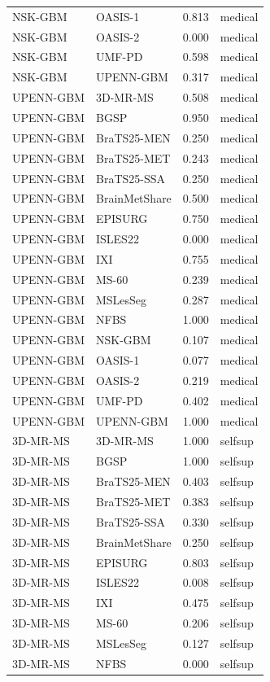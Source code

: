 \begin{tabular}{llrl}
NSK-GBM & OASIS-1 & 0.813 & medical \\
NSK-GBM & OASIS-2 & 0.000 & medical \\
NSK-GBM & UMF-PD & 0.598 & medical \\
NSK-GBM & UPENN-GBM & 0.317 & medical \\
UPENN-GBM & 3D-MR-MS & 0.508 & medical \\
UPENN-GBM & BGSP & 0.950 & medical \\
UPENN-GBM & BraTS25-MEN & 0.250 & medical \\
UPENN-GBM & BraTS25-MET & 0.243 & medical \\
UPENN-GBM & BraTS25-SSA & 0.250 & medical \\
UPENN-GBM & BrainMetShare & 0.500 & medical \\
UPENN-GBM & EPISURG & 0.750 & medical \\
UPENN-GBM & ISLES22 & 0.000 & medical \\
UPENN-GBM & IXI & 0.755 & medical \\
UPENN-GBM & MS-60 & 0.239 & medical \\
UPENN-GBM & MSLesSeg & 0.287 & medical \\
UPENN-GBM & NFBS & 1.000 & medical \\
UPENN-GBM & NSK-GBM & 0.107 & medical \\
UPENN-GBM & OASIS-1 & 0.077 & medical \\
UPENN-GBM & OASIS-2 & 0.219 & medical \\
UPENN-GBM & UMF-PD & 0.402 & medical \\
UPENN-GBM & UPENN-GBM & 1.000 & medical \\
3D-MR-MS & 3D-MR-MS & 1.000 & selfsup \\
3D-MR-MS & BGSP & 1.000 & selfsup \\
3D-MR-MS & BraTS25-MEN & 0.403 & selfsup \\
3D-MR-MS & BraTS25-MET & 0.383 & selfsup \\
3D-MR-MS & BraTS25-SSA & 0.330 & selfsup \\
3D-MR-MS & BrainMetShare & 0.250 & selfsup \\
3D-MR-MS & EPISURG & 0.803 & selfsup \\
3D-MR-MS & ISLES22 & 0.008 & selfsup \\
3D-MR-MS & IXI & 0.475 & selfsup \\
3D-MR-MS & MS-60 & 0.206 & selfsup \\
3D-MR-MS & MSLesSeg & 0.127 & selfsup \\
3D-MR-MS & NFBS & 0.000 & selfsup \\

\end{tabular}

